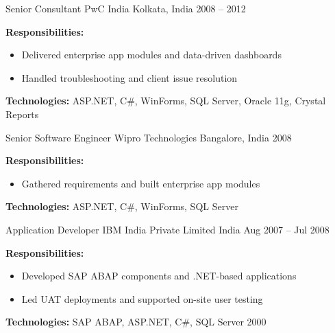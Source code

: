 \begin{cventries}
\cventry
  {Senior Consultant}
  {PwC India}
  {Kolkata, India}
  {2008 – 2012}
  {
    \begin{cvitems}
      \item {\textbf{Responsibilities:}
        \begin{itemize}
          \item Delivered enterprise app modules and data-driven dashboards
          \item Handled troubleshooting and client issue resolution\\
        \end{itemize}
      }
      \item {\textbf{Technologies:} ASP.NET, C\#, WinForms, SQL Server, Oracle 11g, Crystal Reports}\\
    \end{cvitems}
  }

\cventry
  {Senior Software Engineer}
  {Wipro Technologies}
  {Bangalore, India}
  {2008}
  {
    \begin{cvitems}
      \item {\textbf{Responsibilities:}
        \begin{itemize}
          \item Gathered requirements and built enterprise app modules\\
        \end{itemize}
      }
      \item {\textbf{Technologies:} ASP.NET, C\#, WinForms, SQL Server}\\
    \end{cvitems}
  }

\cventry
  {Application Developer}
  {IBM India Private Limited}
  {India}
  {Aug 2007 – Jul 2008}
  {
    \begin{cvitems}
      \item {\textbf{Responsibilities:}
        \begin{itemize}
          \item Developed SAP ABAP components and .NET-based applications
          \item Led UAT deployments and supported on-site user testing\\
        \end{itemize}
      }
      \item {\textbf{Technologies:} SAP ABAP, ASP.NET, C\#, SQL Server 2000}\\
    \end{cvitems}
  }


\end{cventries}
